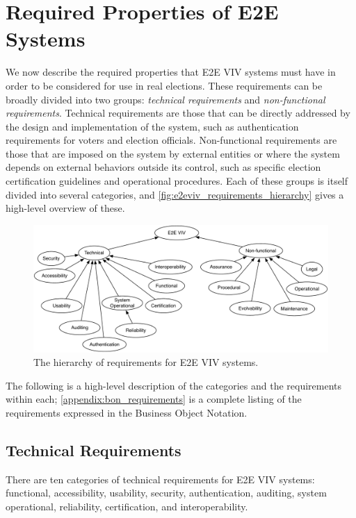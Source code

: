 \chapter{Required Properties of E2E Systems}
\label{chapter:required_properties}

We now describe the required properties that E2E VIV systems must have
in order to be considered for use in real elections. These
requirements can be broadly divided into two groups: \emph{technical
  requirements} and \emph{non-functional requirements}. Technical
requirements are those that can be directly addressed by the design
and implementation of the system, such as authentication requirements
for voters and election officials. Non-functional requirements are
those that are imposed on the system by external entities or where the
system depends on external behaviors outside its control, such as
specific election certification guidelines and operational
procedures. Each of these groups is itself divided into several
categories, and \autoref{fig:e2eviv_requirements_hierarchy} gives a
high-level overview of these.

\begin{figure}
\begin{center}
\includegraphics[width=6in]{required_properties_resources/hierarchy}
\end{center}
\caption{The hierarchy of requirements for E2E VIV systems.}
\label{fig:e2eviv_requirements_hierarchy}
\end{figure}

The following is a high-level description of the categories and the
requirements within each; \autoref{appendix:bon_requirements} is a
complete listing of the requirements expressed in the Business Object
Notation.

\section{Technical Requirements}
There are ten categories of technical requirements for E2E VIV
systems: functional, accessibility, usability, security,
authentication, auditing, system operational, reliability,
certification, and interoperability.

